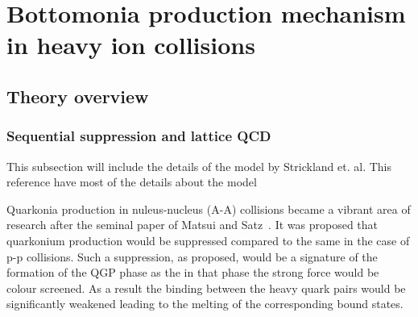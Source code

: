 \section{Bottomonia production mechanism in heavy ion collisions}
\label{sec:Bottomonia_hi}

\subsection{Theory overview}

\subsubsection{Sequential suppression and lattice QCD}
{\color{red} This subsection will include the details of the model by Strickland et. al. This
reference have most of the details about the model~\cite{Mocsy:2013syh}}


 Quarkonia production in nuleus-nucleus (A-A) collisions  became a vibrant area of research after the seminal 
paper of Matsui and Satz~\cite{Matsui:1986dk}. It was proposed that quarkonium production would be suppressed
compared to the same in the case of p-p collisions.  Such a suppression, as proposed, would be a signature of 
the formation of the QGP phase as the in that phase the strong force would be colour screened. As a result 
the binding between the heavy quark pairs would be significantly weakened leading to the melting of the corresponding 
bound states. 


